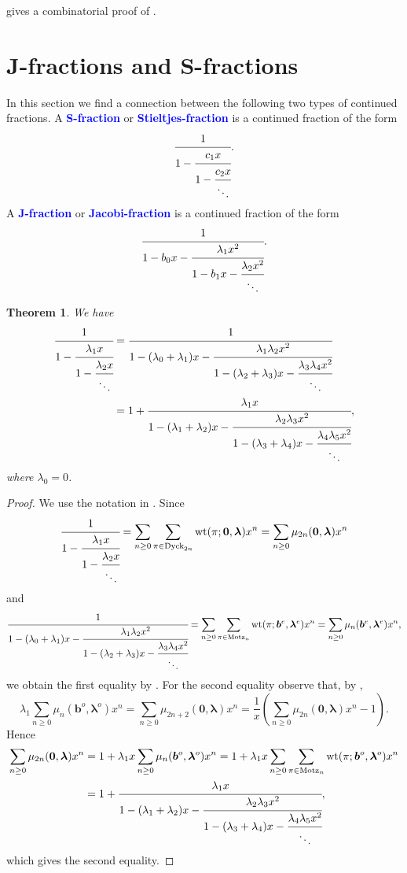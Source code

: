 \documentclass[oneside]{book}
\numberwithin{equation}{section}
\newtheorem{thm}{Theorem}[section]
\theoremstyle{definition}
\newcommand\Motz{\operatorname{Motz}}
\newcommand{\Dyck}{\operatorname{Dyck}}
\newcommand\wt{\operatorname{wt}}
\renewcommand\vec[1]{\bm{#1}}
\newcommand\vb{\vec{b}}
\newcommand\vla{\vec{\lambda}}
\renewcommand\emph[1]{\textcolor{blue}{\bf #1}}
\begin{document}
 gives a combinatorial proof of .

\section{J-fractions and S-fractions}

In this section we find a connection between the following two types
of continued fractions. A \emph{S-fraction} or
\emph{Stieltjes-fraction} is a continued fraction of the form
\[
  \cfrac{1}{
    1 -\cfrac{c_1x}{
      1 - \cfrac{c_2x}{\ddots}}}.
\]
A \emph{J-fraction} or \emph{Jacobi-fraction} is a continued fraction
of the form
\[
  \cfrac{1}{
    1-b_0x- \cfrac{\lambda_1x^2}{
      1-b_1x- \cfrac{\lambda_2x^2}{\ddots}}}.
\]

\begin{thm}
  We have
\begin{align*}
  \cfrac{1}{
    1 -\cfrac{\lambda_1x}{
      1 - \cfrac{\lambda_2x}{\ddots}}}
  &=  \cfrac{1}{
    1-(\lambda_0+\lambda_1)x- \cfrac{\lambda_1\lambda_2x^2}{
      1-(\lambda_2+\lambda_3)x- \cfrac{\lambda_3\lambda_4x^2}{\ddots}}}\\
  &= 1+ \cfrac{\lambda_1 x}{
    1-(\lambda_1+\lambda_2)x- \cfrac{\lambda_2\lambda_3x^2}{
      1-(\lambda_3+\lambda_4)x- \cfrac{\lambda_4\lambda_5x^2}{\ddots}}},
\end{align*}
where \( \lambda_0=0 \).
\end{thm}

\begin{proof}
  We use the notation in . Since
  \[
      \cfrac{1}{
    1 -\cfrac{\lambda_1x}{
      1 - \cfrac{\lambda_2x}{\ddots}}}
  = \sum_{n\ge0} \sum_{\pi\in \Dyck_{2n}} \wt(\pi;\vec 0,\vla) x^n
  = \sum_{n\ge0} \mu_{2n}(\vec 0, \vla) x^n
  \]
  and
  \[
  \cfrac{1}{
    1-(\lambda_0+\lambda_1)x- \cfrac{\lambda_1\lambda_2x^2}{
      1-(\lambda_2+\lambda_3)x- \cfrac{\lambda_3\lambda_4x^2}{\ddots}}}
  = \sum_{n\ge0} \sum_{\pi\in \Motz_{n}} \wt(\pi;\vb^e,\vla^e) x^n
  = \sum_{n\ge0} \mu_{n}(\vb^e, \vla^e) x^n,
  \]
  we obtain the first equality by . For the second
  equality observe that, by , 
  \[
\lambda_1 \sum_{n\ge0} \mu_n(\vb^o, \vla^o) x^n =   \sum_{n\ge0} \mu_{2n+2}(\vec 0, \vla) x^n
  = \frac{1}{x} \left(\sum_{n\ge0} \mu_{2n}(\vec 0, \vla) x^n -1 \right).
  \]
  Hence
  \begin{align*}
 \sum_{n\ge0} \mu_{2n}(\vec 0, \vla) x^n
    &= 1+ \lambda_1x \sum_{n\ge0} \mu_n(\vb^o, \vla^o)x^n
    = 1+ \lambda_1x 
    \sum_{n\ge0} \sum_{\pi\in \Motz_{n}} \wt(\pi;\vb^o,\vla^o) x^n\\
  &= 1+ \cfrac{\lambda_1 x}{
    1-(\lambda_1+\lambda_2)x- \cfrac{\lambda_2\lambda_3x^2}{
      1-(\lambda_3+\lambda_4)x- \cfrac{\lambda_4\lambda_5x^2}{\ddots}}},
  \end{align*}
which gives the second equality.
\end{proof}
\end{document}

